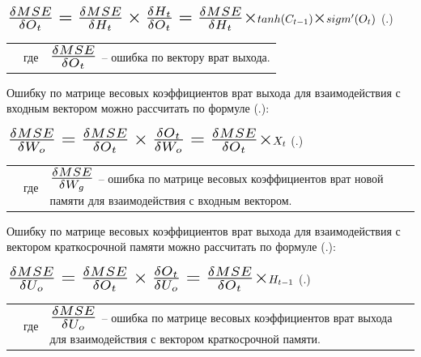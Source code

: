 {  \formulaspace \par \redline 
    $\scaleto{\frac{\delta MSE}{\delta O_t} = \frac{\delta MSE}{\delta H_t} \times \frac{\delta H_t}{\delta O_t} = \frac{\delta MSE}{\delta H_t} \times }{21pt} tanh(C_{t-1}) \scaleto{\times}{10pt} sigm'(O_t)$
    \hfill (\thechaptercntr .\theformulacntr) \redline
  \formulaspace \addtocounter{formulacntr}{1}

  \begin{tabular}{p{}p{}p{}}
    & где  & $\scaleto{\frac{\delta MSE}{\delta O_t}}{21pt}$ {--} ошибка по вектору врат выхода. \\
  \end{tabular}

  \par \redline Ошибку по матрице весовых коэффициентов врат выхода для взаимодействия с входным вектором можно рассчитать по формуле (\thechaptercntr .\theformulacntr):

  \formulaspace \par \redline 
    $\scaleto{\frac{\delta MSE}{\delta W_o} = \frac{\delta MSE}{\delta O_t} \times \frac{\delta O_t}{\delta W_o} = \frac{\delta MSE}{\delta O_t} \times }{22pt} X_t$
    \hfill (\thechaptercntr .\theformulacntr) \redline
  \formulaspace \addtocounter{formulacntr}{1}

  \begin{tabular}{p{}p{}p{}}
		& где  & $\scaleto{\frac{\delta MSE}{\delta W_g}}{21pt}$ {--} ошибка по матрице весовых коэффициентов врат новой памяти для взаимодействия с входным вектором. \\
  \end{tabular}

  \par \redline Ошибку по матрице весовых коэффициентов врат выхода для взаимодействия с вектором краткосрочной памяти можно рассчитать по формуле (\thechaptercntr .\theformulacntr):

  \formulaspace \par \redline 
    $\scaleto{\frac{\delta MSE}{\delta U_o} = \frac{\delta MSE}{\delta O_t} \times \frac{\delta O_t}{\delta U_o} = \frac{\delta MSE}{\delta O_t} \times }{22pt} H_{t-1}$
    \hfill (\thechaptercntr .\theformulacntr) \redline
  \formulaspace \addtocounter{formulacntr}{1}

  \begin{tabular}{p{}p{}p{}}
		& где  & $\scaleto{\frac{\delta MSE}{\delta U_o}}{21pt}$ {--} ошибка по матрице весовых коэффициентов врат выхода для взаимодействия с вектором краткосрочной памяти. \\
  \end{tabular}

}
